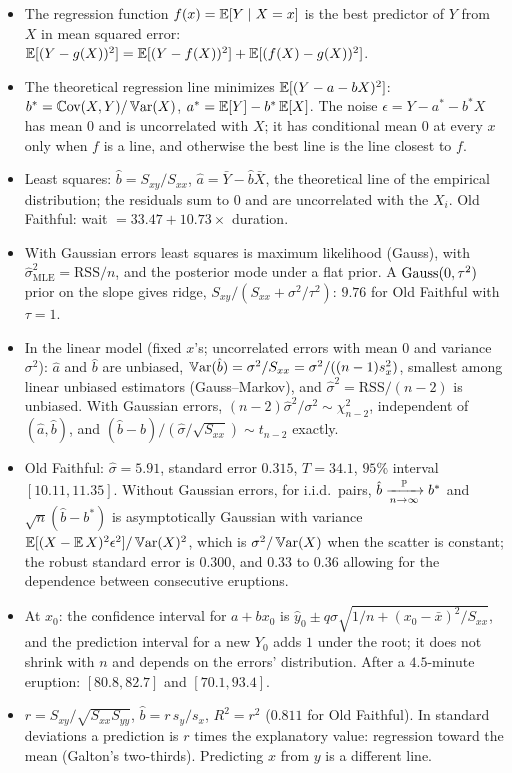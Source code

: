 \begin{itemize}[nosep]
\item The regression function $f(x) = \operatorname*{\mathbb{E}}[Y \mid X = x]$ is the best predictor of $Y$ from $X$ in mean squared error: $\operatorname*{\mathbb{E}}[(Y - g(X))^2] = \operatorname*{\mathbb{E}}[(Y - f(X))^2] + \operatorname*{\mathbb{E}}[(f(X) - g(X))^2]$.
\item The theoretical regression line minimizes $\operatorname*{\mathbb{E}}[(Y - a - bX)^2]$: $b^* = \operatorname*{\mathbb{C}\text{ov}}(X, Y)/\operatorname*{\mathbb{V}\text{ar}}(X)$, $a^* = \operatorname*{\mathbb{E}}[Y] - b^*\operatorname*{\mathbb{E}}[X]$. The noise $\epsilon = Y - a^* - b^*X$ has mean $0$ and is uncorrelated with $X$; it has conditional mean $0$ at every $x$ only when $f$ is a line, and otherwise the best line is the line closest to $f$.
\item Least squares: $\hat{b} = S_{xy}/S_{xx}$, $\hat{a} = \bar{Y} - \hat{b}\bar{X}$, the theoretical line of the empirical distribution; the residuals sum to $0$ and are uncorrelated with the $X_i$. Old Faithful: wait $= 33.47 + 10.73 \times$ duration.
\item With Gaussian errors least squares is maximum likelihood (Gauss), with $\hat{\sigma}^2_{\mathrm{MLE}} = \mathrm{RSS}/n$, and the posterior mode under a flat prior. A $\text{Gauss}(0, \tau^2)$ prior on the slope gives ridge, $S_{xy}/(S_{xx} + \sigma^2/\tau^2)$: $9.76$ for Old Faithful with $\tau = 1$.
\item In the linear model (fixed $x$'s; uncorrelated errors with mean $0$ and variance $\sigma^2$): $\hat{a}$ and $\hat{b}$ are unbiased, $\operatorname*{\mathbb{V}\text{ar}}(\hat{b}) = \sigma^2/S_{xx} = \sigma^2/((n - 1)s_x^2)$, smallest among linear unbiased estimators (Gauss--Markov), and $\hat{\sigma}^2 = \mathrm{RSS}/(n - 2)$ is unbiased. With Gaussian errors, $(n - 2)\hat{\sigma}^2/\sigma^2 \sim \chi^2_{n-2}$, independent of $(\hat{a}, \hat{b})$, and $(\hat{b} - b)/(\hat{\sigma}/\sqrt{S_{xx}}) \sim t_{n-2}$ exactly.
\item Old Faithful: $\hat{\sigma} = 5.91$, standard error $0.315$, $T = 34.1$, $95\%$ interval $[10.11, 11.35]$. Without Gaussian errors, for i.i.d.\ pairs, $\hat{b} \xrightarrow [n \to \infty ]{\mathbb{P}} b^*$ and $\sqrt{n}(\hat{b} - b^*)$ is asymptotically Gaussian with variance $\operatorname*{\mathbb{E}}[(X - \operatorname*{\mathbb{E}} X)^2\epsilon^2]/\operatorname*{\mathbb{V}\text{ar}}(X)^2$, which is $\sigma^2/\operatorname*{\mathbb{V}\text{ar}}(X)$ when the scatter is constant; the robust standard error is $0.300$, and $0.33$ to $0.36$ allowing for the dependence between consecutive eruptions.
\item At $x_0$: the confidence interval for $a + bx_0$ is $\hat{y}_0 \pm q\hat{\sigma}\sqrt{1/n + (x_0 - \bar{x})^2/S_{xx}}$, and the prediction interval for a new $Y_0$ adds $1$ under the root; it does not shrink with $n$ and depends on the errors' distribution. After a $4.5$-minute eruption: $[80.8, 82.7]$ and $[70.1, 93.4]$.
\item $r = S_{xy}/\sqrt{S_{xx}S_{yy}}$, $\hat{b} = r\,s_y/s_x$, $R^2 = r^2$ ($0.811$ for Old Faithful). In standard deviations a prediction is $r$ times the explanatory value: regression toward the mean (Galton's two-thirds). Predicting $x$ from $y$ is a different line.
\end{itemize}

